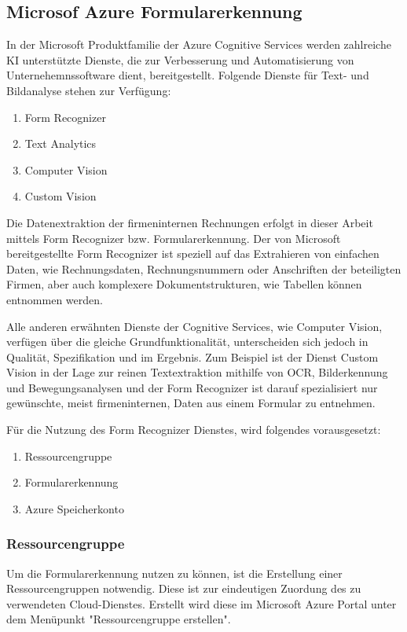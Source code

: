 \subsection{Microsof Azure Formularerkennung}

In der Microsoft Produktfamilie der Azure Cognitive Services werden zahlreiche KI unterstützte Dienste, die zur Verbesserung 
und Automatisierung von Unternehemnssoftware dient, bereitgestellt. Folgende Dienste für Text- und Bildanalyse stehen zur Verfügung:

\begin{enumerate}
    \item Form Recognizer
    \item Text Analytics
    \item Computer Vision
    \item Custom Vision
\end{enumerate}

Die Datenextraktion der firmeninternen Rechnungen erfolgt in dieser Arbeit mittels Form Recognizer bzw. Formularerkennung.
Der von Microsoft bereitgestellte Form Recognizer ist speziell auf das Extrahieren von einfachen Daten, wie Rechnungsdaten, 
Rechnungsnummern oder Anschriften der beteiligten Firmen, aber auch komplexere Dokumentstrukturen, wie Tabellen können entnommen 
werden. 

Alle anderen erwähnten Dienste der Cognitive Services, wie Computer Vision, verfügen über die gleiche Grundfunktionalität, unterscheiden 
sich jedoch in Qualität, Spezifikation und im Ergebnis. Zum Beispiel ist der Dienst Custom Vision in der Lage zur reinen Textextraktion mithilfe von OCR,
Bilderkennung und Bewegungsanalysen und der Form Recognizer ist darauf spezialisiert nur gewünschte, meist firmeninternen, Daten aus einem Formular zu entnehmen.

Für die Nutzung des Form Recognizer Dienstes, wird folgendes vorausgesetzt:
\begin{enumerate}
    \item Ressourcengruppe
    \item Formularerkennung
    \item Azure Speicherkonto
\end{enumerate}

\subsubsection{Ressourcengruppe}
Um die Formularerkennung nutzen zu können, ist die Erstellung einer Ressourcengruppen notwendig. Diese ist zur eindeutigen Zuordung des zu verwendeten Cloud-Dienstes.
Erstellt wird diese im Microsoft Azure Portal unter dem Menüpunkt "Ressourcengruppe erstellen".

